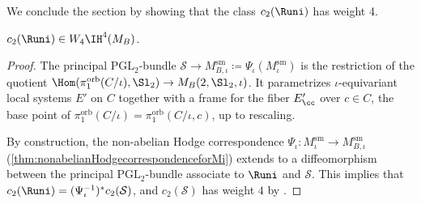 We conclude the section by showing that the class $c_2(\Runi)$ has weight 4.
\begin{lem}\label{lem:weightc2R}
$c_2(\Runi) \in W_4 \IH^4({M}_B)$.
\end{lem}
\begin{proof}
The principal $\mathrm{PGL}_2$-bundle $\mathcal{S} \to M^{\mathrm{sm}}_{B, \iota} \coloneqq \Psi_\iota(M^{\mathrm{sm}}_{\iota})$ is the restriction of the quotient $\Hom(\pi^{\mathrm{orb}}_1(C/\iota), \Sl_2) \to {M}_B(2, \Sl_2,\iota)$. It parametrizes $\iota$-equivariant local systems $E'$ on $C$ together with a frame for the fiber $E'_{\cc}$ over $c \in C$, \ie the base point of $\pi^{\mathrm{orb}}_1(C/\iota) = \pi^{\mathrm{orb}}_1(C/\iota, c)$, up to rescaling.

By construction, the non-abelian Hodge correspondence $\Psi_{\iota}\colon M^{\mathrm{sm}}_{\iota} \to M^{\mathrm{sm}}_{B, \iota}$ (\cref{thm:nonabelianHodgecorrespondenceforMi}) extends to a diffeomorphism between the principal $\mathrm{PGL}_2$-bundle associate to $\Runi$ and $\mathcal{S}$. This implies that
$c_2(\Runi) = (\Psi_{\iota}^{-1})^*c_2(\mathcal{S})$, and $c_2(\mathcal{S})$ has weight $4$ by \cite[Th.\,9.1.1, Prop.\,9.1.2]{Deligne74}.
\end{proof}

\label{sec:invIH}

